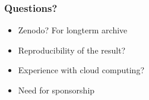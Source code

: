 \documentclass[table]{beamer}
\begin{document}
\begin{frame}
    \frametitle{Questions?}

    \begin{itemize}
        \item Zenodo? For longterm archive
        \item Reproducibility of the result?
        \item Experience with cloud computing?
        \item Need for sponsorship
    \end{itemize}
\end{frame}
\end{document}
